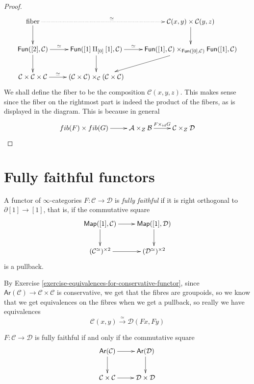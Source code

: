 \begin{proof}
$$
\xymatrix{
\text{fiber}\ar[d]\ar@{.>}[rr]^{\simeq}&&
\mathcal{C}(x,y)\times \mathcal{C}(y,z)\ar[d]\\
\mathsf{Fun}([2],\mathcal{C})\ar[r]^-{\simeq}\ar[d]&
\mathsf{Fun}([1]\amalg_{[0]}[1],\mathcal{C})\ar[r]^-{\simeq}\ar[d]
&\mathsf{Fun}([1],\mathcal{C})\times_{\mathsf{Fun}([0],\mathcal{C})}
\mathsf{Fun}([1],\mathcal{C})\ar[ld]\\
\mathcal{C}\times\mathcal{C}\times\mathcal{C}\ar[r]^-{\simeq}&
(\mathcal{C} \times \mathcal{C})
\times_{\mathcal{C}}(\mathcal{C}\times\mathcal{C})
}
$$
We shall define the fiber to be the
composition $\mathcal{C}(x,y,z)$.
This makes sense since
the fiber on the rightmost part
is indeed the product of the fibers, 
as is displayed in the diagram.
This is because in general
$$
\xymatrix{
fib(F)\times fib(G)\ar[r]&  \mathcal{A}\times_Z \mathcal{B}
\ar[r]^{F\times_{\text{id}}G}&
\mathcal{C}\times_Z \mathcal{D}
}
$$
\end{proof}


\section{Fully faithful functors}
\label{section-fully-faithful-functors}

\begin{definition}
\label{definition-fully-faithful}
A functor of $\infty$-categories $F:\mathcal{C} \to \mathcal{D}$ 
is {\it fully faithful} if it is
right orthogonal to $\partial[1] \to [1]$,
that is, if the commutative square
$$
\xymatrix{
\mathsf{Map}([1],\mathcal{C})\ar[r]\ar[d]&
\mathsf{Map}([1],\mathcal{D})\ar[d]\\
(\mathcal{C}^\simeq)^{\times 2}\ar[r]&
(\mathcal{D}^\simeq)^{\times 2}
}
$$
is a pullback.
\end{definition}

By Exercise \ref{exercise-equivalences-for-conservative-functor}, since 
$\mathsf{Ar}(\mathcal{C})\to \mathcal{C}\times\mathcal{C}$
is conservative, we get that the fibres
are groupoids, so we know that we get equivalences
on the fibres when we get a pullback, so really we have
equivalences
$$
\mathcal{C}(x,y)\xrightarrow{\simeq}\mathcal{D}(Fx,Fy)
$$
\begin{proposition}
\label{proposition-fully-faithfull-iff-pullback}
$F:\mathcal{C} \to \mathcal{D}$ is fully faithful
if and only if the commutative square
$$
\xymatrix{
\mathsf{Ar}(\mathcal{C})\ar[r]\ar[d]&\mathsf{Ar}(\mathcal{D})\ar[d]\\
\mathcal{C}\times\mathcal{C}\ar[r]&\mathcal{D}\times\mathcal{D}
}
$$
\end{proposition}

